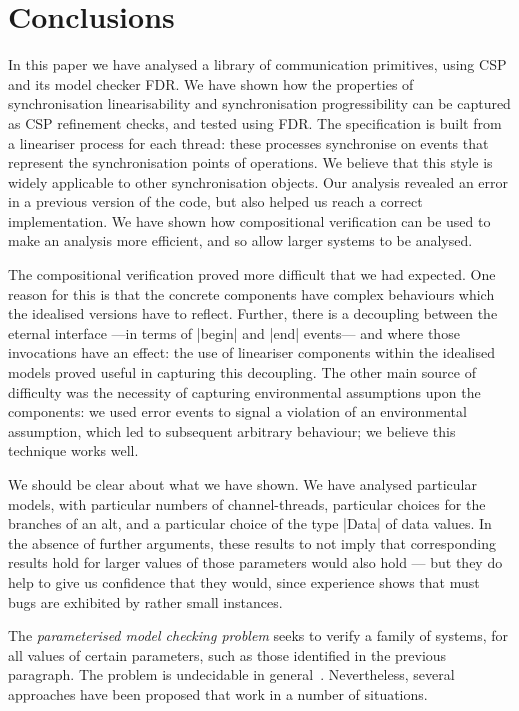 \section{Conclusions}
\label{sec:conc}

In this paper we have analysed a library of communication primitives, using
CSP and its model checker FDR\@.  We have shown how the properties of
synchronisation linearisability and synchronisation progressibility can be
captured as CSP refinement checks, and tested using FDR.  The specification is
built from a lineariser process for each thread: these processes synchronise
on events that represent the synchronisation points of operations.  We believe
that this style is widely applicable to other synchronisation objects.
%
Our analysis revealed an error in a previous version of the code, but also
helped us reach a correct implementation.  We have shown how compositional
verification can be used to make an analysis more efficient, and so allow
larger systems to be analysed.

The compositional verification proved more difficult that we had expected.
One reason for this is that the concrete components have complex behaviours
which the idealised versions have to reflect.  Further, there is a decoupling
between the eternal interface ---in terms of |begin| and |end| events--- and
where those invocations have an effect: the use of lineariser components
within the idealised models proved useful in capturing this decoupling.  The
other main source of difficulty was the necessity of capturing environmental
assumptions upon the components: we used error events to signal a violation of
an environmental assumption, which led to subsequent arbitrary behaviour; we
believe this technique works well.

We should be clear about what we have shown.  We have analysed particular
models, with particular numbers of channel-threads, particular choices for the
branches of an alt, and a particular choice of the type |Data| of data values.
In the absence of further arguments, these results to not imply that
corresponding results hold for larger values of those parameters would also
hold --- but they do help to give us confidence that they would, since
experience shows that must bugs are exhibited by rather small instances.

The \emph{parameterised model checking problem} seeks to verify a family of
systems, for all values of certain parameters, such as those identified in the
previous paragraph.  The problem is undecidable in general~\cite{apt-kozen,
  tomasz-gavin-CA}.  Nevertheless, several approaches have been proposed that
work in a number of situations.

